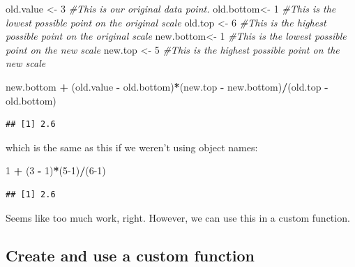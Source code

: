 \documentclass[
]{article}
\newenvironment{Shaded}{\begin{snugshade}}{\end{snugshade}}
\newcommand{\CommentTok}[1]{\textcolor[rgb]{0.56,0.35,0.01}{\textit{#1}}}
\newcommand{\DecValTok}[1]{\textcolor[rgb]{0.00,0.00,0.81}{#1}}
\newcommand{\NormalTok}[1]{#1}
\newcommand{\OperatorTok}[1]{\textcolor[rgb]{0.81,0.36,0.00}{\textbf{#1}}}
\newcommand{\StringTok}[1]{\textcolor[rgb]{0.31,0.60,0.02}{#1}}
\begin{document}
\begin{Shaded}
\begin{Highlighting}[]
\NormalTok{old.value <-}\StringTok{  }\DecValTok{3}  \CommentTok{#This is our original data point. }
\NormalTok{old.bottom<-}\StringTok{  }\DecValTok{1}  \CommentTok{#This is the lowest possible point on the original scale}
\NormalTok{old.top   <-}\StringTok{  }\DecValTok{6}  \CommentTok{#This is the highest possible point on the original scale}
\NormalTok{new.bottom<-}\StringTok{  }\DecValTok{1}  \CommentTok{#This is the lowest possible point on the new scale}
\NormalTok{new.top   <-}\StringTok{  }\DecValTok{5}  \CommentTok{#This is the highest possible point on the new scale}
\end{Highlighting}
\end{Shaded}

\begin{Shaded}
\begin{Highlighting}[]
\NormalTok{new.bottom }\OperatorTok{+}\StringTok{ }\NormalTok{(old.value }\OperatorTok{-}\StringTok{ }\NormalTok{old.bottom)}\OperatorTok{*}\NormalTok{(new.top }\OperatorTok{-}\StringTok{ }\NormalTok{new.bottom)}\OperatorTok{/}\NormalTok{(old.top }\OperatorTok{-}\StringTok{ }\NormalTok{old.bottom)}
\end{Highlighting}
\end{Shaded}

\begin{verbatim}
## [1] 2.6
\end{verbatim}

which is the same as this if we weren't using object names:

\begin{Shaded}
\begin{Highlighting}[]
\DecValTok{1} \OperatorTok{+}\StringTok{ }\NormalTok{(}\DecValTok{3} \OperatorTok{-}\StringTok{ }\DecValTok{1}\NormalTok{)}\OperatorTok{*}\NormalTok{(}\DecValTok{5-1}\NormalTok{)}\OperatorTok{/}\NormalTok{(}\DecValTok{6-1}\NormalTok{)}
\end{Highlighting}
\end{Shaded}

\begin{verbatim}
## [1] 2.6
\end{verbatim}

Seems like too much work, right. However, we can use this in a custom function.

\hypertarget{create-and-use-a-custom-function}{%
\subsection{Create and use a custom function}\label{create-and-use-a-custom-function}}
\end{document}

